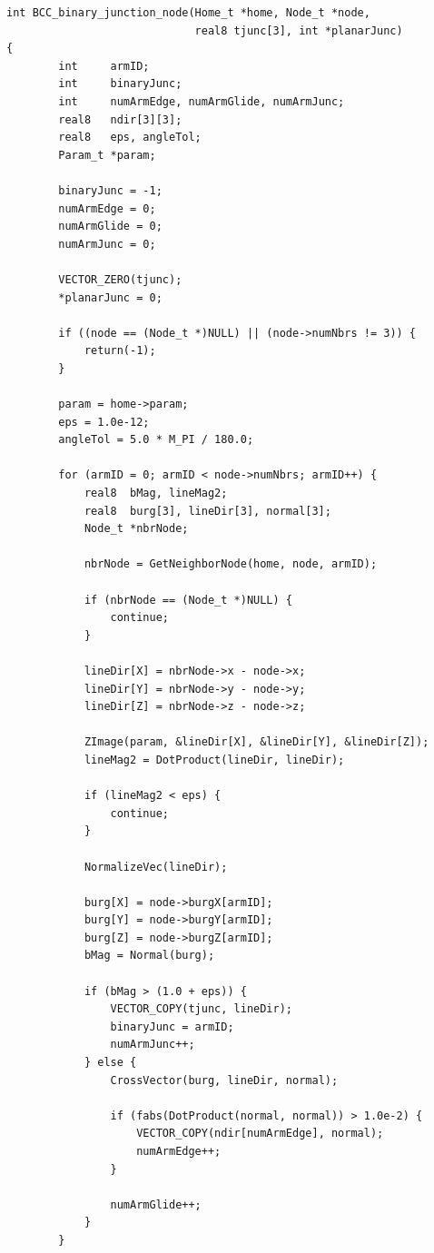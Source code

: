 \documentclass[11pt]{article}
\begin{document}
\begin{lstlisting}[style=cpp]
int BCC_binary_junction_node(Home_t *home, Node_t *node,
                             real8 tjunc[3], int *planarJunc)
{
        int     armID;
        int     binaryJunc;
        int     numArmEdge, numArmGlide, numArmJunc;
        real8   ndir[3][3];
        real8   eps, angleTol;
        Param_t *param;

        binaryJunc = -1;
        numArmEdge = 0;
        numArmGlide = 0;
        numArmJunc = 0;

        VECTOR_ZERO(tjunc);
        *planarJunc = 0;

        if ((node == (Node_t *)NULL) || (node->numNbrs != 3)) {
            return(-1);
        }

        param = home->param;
        eps = 1.0e-12;
        angleTol = 5.0 * M_PI / 180.0;

        for (armID = 0; armID < node->numNbrs; armID++) {
            real8  bMag, lineMag2;
            real8  burg[3], lineDir[3], normal[3];
            Node_t *nbrNode;

            nbrNode = GetNeighborNode(home, node, armID);

            if (nbrNode == (Node_t *)NULL) {
                continue;
            }

            lineDir[X] = nbrNode->x - node->x;
            lineDir[Y] = nbrNode->y - node->y;
            lineDir[Z] = nbrNode->z - node->z;

            ZImage(param, &lineDir[X], &lineDir[Y], &lineDir[Z]);
            lineMag2 = DotProduct(lineDir, lineDir);

            if (lineMag2 < eps) {
                continue;
            }

            NormalizeVec(lineDir);

            burg[X] = node->burgX[armID];
            burg[Y] = node->burgY[armID];
            burg[Z] = node->burgZ[armID];
            bMag = Normal(burg);

            if (bMag > (1.0 + eps)) {
                VECTOR_COPY(tjunc, lineDir);
                binaryJunc = armID;
                numArmJunc++;
            } else {
                CrossVector(burg, lineDir, normal);

                if (fabs(DotProduct(normal, normal)) > 1.0e-2) {
                    VECTOR_COPY(ndir[numArmEdge], normal);
                    numArmEdge++;
                }

                numArmGlide++;
            }
        }


\end{lstlisting}
\end{document}
